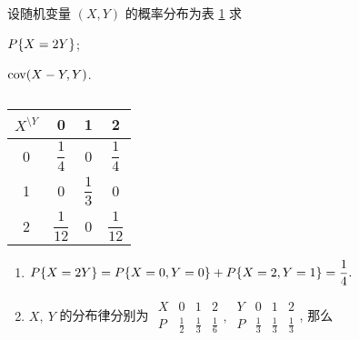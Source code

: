 \begin{example}
    设随机变量 $(X,Y)$ 的概率分布为表 \ref{012140140130} 求\newline
    \begin{enumerate*}[label=(\arabic{*})]
        \item $P\qty{X=2Y}$;
        \item $\mathrm{cov}(X-Y,Y)$.
    \end{enumerate*}
\end{example}
\begin{solution}
    \begin{minipage}{0.3\linewidth}
        \begin{table}[H]
            \centering
            \caption{}
            \label{012140140130}
            \begin{tabular}{c | c c c}
                $X^{\displaystyle\setminus Y}$ & 0               & 1              & 2               \\
                \midrule
                0                              & $\dfrac{1}{4}$  & 0              & $\dfrac{1}{4}$  \\[6pt]
                1                              & 0               & $\dfrac{1}{3}$ & 0               \\[6pt]
                2                              & $\dfrac{1}{12}$ & 0              & $\dfrac{1}{12}$
            \end{tabular}
        \end{table}
    \end{minipage}\hfill
    \begin{minipage}{0.69\linewidth}
        \begin{enumerate}[label=(\arabic{*})]
            \item $P\qty{X=2Y}=P\qty{X=0,Y=0}+P\qty{X=2,Y=1}=\dfrac{1}{4}.$
            \item $X,~Y$ 的分布律分别为 $\begin{array}{c|ccc}
                          X & 0           & 1           & 2           \\\hline
                          P & \frac{1}{2} & \frac{1}{3} & \frac{1}{6}
                      \end{array},~\begin{array}{c|ccc}
                          Y & 0           & 1           & 2           \\\hline
                          P & \frac{1}{3} & \frac{1}{3} & \frac{1}{3}
                      \end{array}$, 那么

\end{enumerate}
\end{minipage}
\end{solution}
